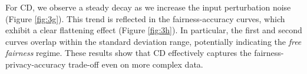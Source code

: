 \documentclass[11pt,letterpaper]{article}
\begin{document}
For CD, we observe a steady decay as we increase the input perturbation noise (Figure \ref{fig:3g}). This trend is reflected in the fairness-accuracy curves, which exhibit a clear flattening effect (Figure \ref{fig:3h}). In particular, the first and second curves overlap within the standard deviation range, potentially indicating the \textit{free fairness} regime. These results show that CD  effectively captures the fairness-privacy-accuracy trade-off even on more complex data.


















\vspace{-2mm}
\end{document}
